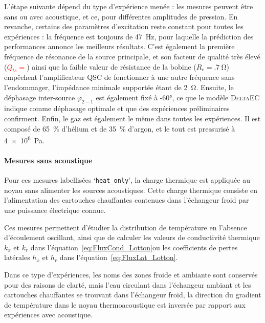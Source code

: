 L'étape suivante dépend du type d'expérience menée : les mesures peuvent être sans ou avec acoustique, et ce, pour  différentes amplitudes de pression. En revanche, certains des paramètres d'excitation reste constant pour toutes les expériences : la fréquence est toujours de \qty{47}{\hertz}, pour laquelle la prédiction des performances annonce les meilleurs résultats. C'est également la première fréquence de résonance de la source principale, et son facteur de qualité très élevé (\textcolor{red}{$Q_{ts}=$}) ainsi que la faible valeur de résistance de la bobine ($R_e=\qty{.7}{\ohm}$) empêchent l'amplificateur QSC de fonctionner à une autre fréquence sans l'endommager, l'impédance minimale supportée étant de \qty{2}{\ohm}. Ensuite, le déphasage inter-source $\varphi_{2-1}$ est également fixé à \ang{-60}, ce que le modèle \textsc{DeltaEC} indique comme déphasage optimale et que des expériences préliminaires confirment. Enfin, le gaz est également le même dans toutes les expériences. Il est composé de \qty{65}{\percent} d'hélium et de \qty{35}{\percent} d'argon, et le tout est pressurisé à \qty{4e6}{\pascal}.

\paragraph{Mesures sans acoustique}\label{chap:MesureSansAcou}
Pour ces mesures labellisées `\texttt{heat\_{}only}', la charge thermique est appliquée au noyau sans alimenter les sources acoustiques. Cette charge thermique consiste en l'alimentation des cartouches chauffantes contenues dans l'échangeur froid par une puissance électrique connue. 

Ces mesures permettent d'étudier la distribution de température en l'absence d'écoulement oscillant, ainsi que de calculer les valeurs de conductivité thermique $k_x$ et $k_r$ dans l'équation~\eqref{eq:FluxCond_Lotton}ou les coefficients de pertes latérales $h_x$ et $h_r$ dans l'équation~\eqref{eq:FluxLat_Lotton}.\medskip

Dans ce type d'expériences, les noms des zones \og froide \fg{} et \og ambiante \fg{} sont conservés pour des raisons de clarté, mais l'eau circulant dans l'échangeur ambiant et les cartouches chauffantes se trouvant dans l'échangeur froid, la direction du gradient de température dans le noyau thermoacoustique est inversée par rapport aux expériences avec acoustique. %

